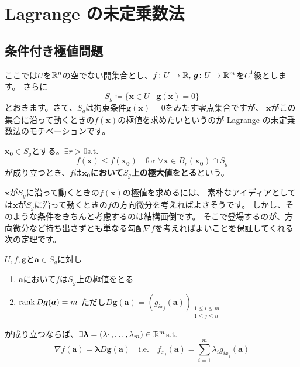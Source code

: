 \documentclass[report]{jlreq}
\begin{document}
%
\chapter{Lagrange の未定乗数法}


%
\section{条件付き極値問題}

ここでは$U$を$\mathbb{R}^n$の空でない開集合とし、$f \colon U \to \mathbb{R},\, \bm{g} \colon U \to \mathbb{R}^m$を$C^1$級とします。
さらに
\begin{equation}
    S_g \coloneqq \{ \bm{x} \in U \mid \bm{g}(\bm{x}) = 0 \}
\end{equation}
とおきます。さて、$S_g$は拘束条件$\bm{g}(\bm{x}) = 0$をみたす零点集合ですが、
$\bm{x}$がこの集合に沿って動くときの$f(\bm{x})$の極値を求めたいというのが
Lagrange の未定乗数法のモチベーションです。

\begin{definition}
    $\bm{x_0} \in S_g$とする。$\exists r > 0$\quad s.t.
    \begin{equation}
        f(\bm{x}) \le f(\bm{x_0}) \quad \text{for $\forall \bm{x} \in B_r(\bm{x_0}) \cap S_g$}
    \end{equation}
    が成り立つとき、$f$は\textbf{$\bm{x_0}$において$S_g$上の極大値をとる}という。
\end{definition}

$\bm{x}$が$S_g$に沿って動くときの$f(\bm{x})$の極値を求めるには、
素朴なアイディアとしては$\bm{x}$が$S_g$に沿って動くときの$f$の方向微分を考えればよさそうです。
しかし、そのような条件をきちんと考慮するのは結構面倒です。
そこで登場するのが、方向微分など持ち出さずとも単なる勾配$\nabla f$を考えればよいことを保証してくれる次の定理です。

\begin{theorem}
    $U, f, \bm{g}$と$\bm{a} \in S_g$に対し
    \begin{enumerate}
        \item $\bm{a}$において$f$は$S_g$上の極値をとる
        \item $\operatorname{rank} D\bm{g}(\bm{a}) = m$
            \quad ただし$D\bm{g}(\bm{a})
                = \left( g_{i x_j}(\bm{a}) \right)_{\substack{1 \le i \le m \\ 1 \le j \le n}}$
    \end{enumerate}
    が成り立つならば、$\exists \bm{\lambda} = (\lambda_1, \dots, \lambda_m) \in \mathbb{R}^m$\quad s.t.
    \begin{equation}
        \nabla f(\bm{a}) = \bm{\lambda} D\bm{g}(\bm{a})
            \quad\text{i.e.}\quad f_{x_j}(\bm{a}) = \sum_{i=1}^m \lambda_i g_{i x_j}(\bm{a})
    \end{equation}
\end{theorem}
\end{document}
